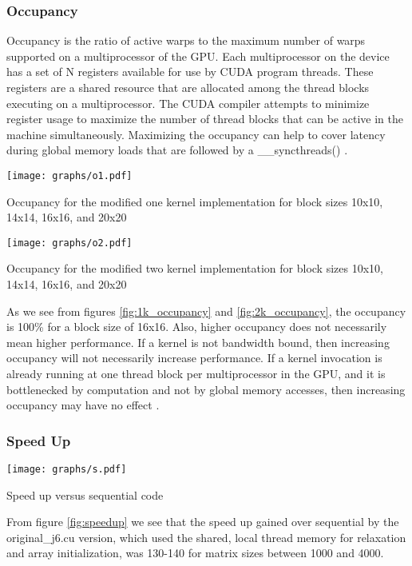 \documentclass[10pt]{article}
\makeatletter
\newenvironment{figurehere}
{\def\@captype{figure}}
{}
\makeatother
\begin{document}
\begin{multicols}{2}
  \subsubsection{Occupancy}
  Occupancy is the ratio of active warps to the maximum number of warps supported on a multiprocessor of the GPU.
  Each multiprocessor on the device has a set of N registers available for use by CUDA program threads.
  These registers are a shared resource that are allocated among the thread blocks executing on a multiprocessor.
  The CUDA compiler attempts to minimize register usage to maximize the number of thread blocks that can be active in the machine simultaneously.
  Maximizing the occupancy can help to cover latency during global memory loads that are followed by a \_\_syncthreads() \cite{bib:nvidia}.

  \begin{figurehere}
    \centering
    \texttt{[image: graphs/o1.pdf]}
    \caption{Occupancy for the modified one kernel implementation for block sizes 10x10, 14x14, 16x16, and 20x20}
    \label{fig:1k_occupancy}
  \end{figurehere}

  \begin{figurehere}
    \centering
    \texttt{[image: graphs/o2.pdf]}
    \caption{Occupancy for the modified two kernel implementation for block sizes 10x10, 14x14, 16x16, and 20x20}
    \label{fig:2k_occupancy}
  \end{figurehere}

  As we see from figures \ref{fig:1k_occupancy} and \ref{fig:2k_occupancy}, the occupancy is 100\% for a block size of 16x16.
  Also, higher occupancy does not necessarily mean higher performance.
  If a kernel is not bandwidth bound, then increasing occupancy will not necessarily increase performance.
  If a kernel invocation is already running at one thread block per multiprocessor in the GPU, and it is bottlenecked by computation and not by global memory accesses, then increasing occupancy may have no effect \cite{bib:nvidia}.

  \subsubsection{Speed Up}

  \begin{figurehere}
    \centering
    \texttt{[image: graphs/s.pdf]}
    \caption{Speed up versus sequential code}
    \label{fig:speedup}
  \end{figurehere}
  From figure \ref{fig:speedup} we see that the speed up gained over sequential by the original\_j6.cu version, which used the shared, local thread memory for relaxation and array initialization, was 130-140 for matrix sizes between 1000 and 4000.


\end{multicols}
\end{document}
